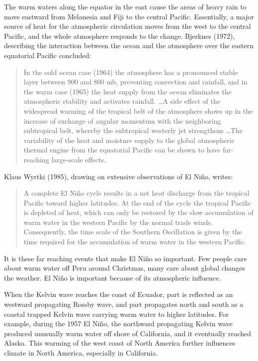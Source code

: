 The warm waters along the equator in the east cause the areas of heavy rain to move eastward from Melanesia and Fiji to the central Pacific. Essentially, a major source of heat for the atmospheric circulation moves from the west to the central Pacific, and the whole atmosphere responds to the change. Bjerknes (1972), describing the interaction between the ocean and the atmosphere over the eastern equatorial Pacific concluded:
\begin{quote} \small
In the cold ocean case (1964) the atmosphere has a pronounced stable layer between 900 and 800 mb, preventing convection and rainfall, and in the warm case (1965) the heat supply from the ocean eliminates the atmospheric stability and activates rainfall. \ldots A side effect of the widespread warming of the tropical belt of the atmosphere shows up in the increase of exchange of angular momentum with the neighboring subtropical belt, whereby the subtropical westerly jet strengthens \ldots The variability of the heat and moisture supply to the global atmospheric thermal engine from the equatorial Pacific can be shown to have far-reaching large-scale effects.
\end{quote}
Klaus Wyrtki (1985), drawing on extensive observations of El Ni\~{n}o, writes:
\begin{quote}\small
A complete El Ni\~{n}o cycle results in a net heat discharge from the tropical Pacific toward higher latitudes. At the end of the cycle the tropical Pacific is depleted of heat, which can only be restored by the slow accumulation of warm water in the western Pacific by the normal trade winds. Consequently, the time scale of the Southern Oscillation is given by the time required for the accumulation of warm water in the western Pacific.
\end{quote}

It is these far reaching events that make  El Ni\~{n}o so important. Few people care about warm water off Peru around Christmas, many care about global changes the weather. El Ni\~{n}o is important because of its atmospheric influence.

When the Kelvin wave reaches the coast of Ecuador, part is reflected as an westward propagating Rossby wave, and part propagates north and south as a coastal trapped Kelvin wave carrying warm water to higher latitudes. For example, during the 1957 El Ni\~{n}o, the northward propagating Kelvin wave produced unusually warm water off shore of California, and it eventually reached Alaska. This warming of the west coast of North America further influences climate in North America, especially in California.

